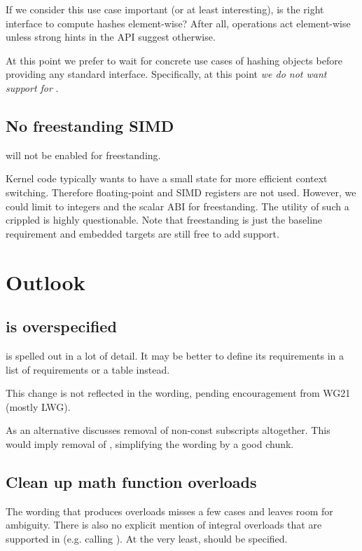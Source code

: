 If we consider this use case important (or at least interesting), is
\std{} the right interface to compute hashes element-wise?
After all,  operations act element-wise unless strong hints in the
API suggest otherwise.

At this point we prefer to wait for concrete use cases of hashing \simd objects
before providing any standard interface.
Specifically, at this point \emph{we do not want \std{} support for
\simd}.

\subsection{No freestanding SIMD}\label{sec:freestanding}

 will not be enabled for freestanding.

Kernel code typically wants to have a small state for more efficient
context switching.
Therefore floating-point and SIMD registers are not used.
However, we could limit \simd to integers and the scalar ABI for freestanding.
The utility of such a crippled \simd is highly questionable.
Note that freestanding is just the baseline requirement and embedded targets
are still free to add  support.

\section{Outlook}
\subsection{ is overspecified}
 is spelled out in a lot of detail.
It may be better to define its requirements in a list of requirements or a table instead.

This change is not reflected in the wording, pending encouragement from WG21 (mostly LWG).

As an alternative \cite{P3275R0} discusses removal of non-const subscripts
altogether.
This would imply removal of , simplifying the wording
by a good chunk.

\subsection{Clean up math function overloads}
The wording that produces \simd overloads misses a few cases and leaves room for ambiguity.
There is also no explicit mention of integral overloads that are supported in  (e.g. \std{} calling \std{}).
At the very least, \std{} should be specified.

